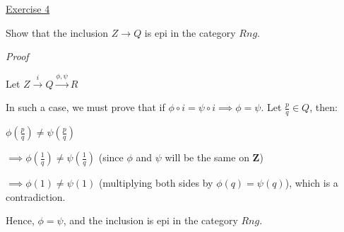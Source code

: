 \noindent
\underline{Exercise 4}
\vspace{2mm}

Show that the inclusion $Z \to Q$ is epi in the category $Rng$.

\vspace{2mm}

\noindent
\emph{Proof}

Let $Z \xrightarrow{i} Q \xrightarrow{\phi, \psi} R$

In such a case, we must prove that if $\phi \circ i = \psi \circ i \implies \phi = \psi$. Let $\frac{p}{q} \in Q $, then:

$\phi(\frac{p}{q}) \neq \psi(\frac{p}{q})$ 

$\implies \phi(\frac{1}{q}) \neq \psi(\frac{1}{q})$ (since $\phi$ and $\psi$ will be the same on $\mathbf{Z}$)

$\implies \phi(1) \neq \psi(1)$ (multiplying both sides by $\phi(q) = \psi(q)$), which is a contradiction.

Hence, $\phi = \psi$, and the inclusion is epi in the category $Rng$.

\vspace{2mm}
